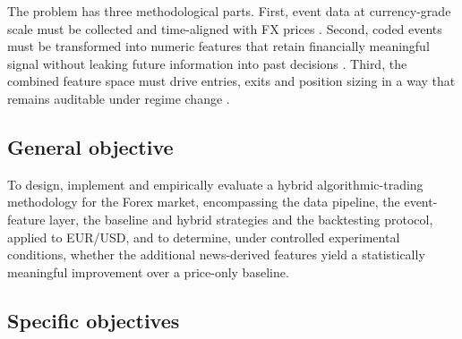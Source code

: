 The problem has three methodological parts. First, event data at currency-grade scale must be collected and time-aligned with FX prices \cite{leetaru2013gdelt}. Second, coded events must be transformed into numeric features that retain financially meaningful signal without leaking future information into past decisions \cite{loughran2011liability,tetlock2007giving}. Third, the combined feature space must drive entries, exits and position sizing in a way that remains auditable under regime change \cite{lopezdeprado2018advances}.


\subsection{General objective}

To design, implement and empirically evaluate a hybrid algorithmic-trading methodology for the Forex market, encompassing the data pipeline, the event-feature layer, the baseline and hybrid strategies and the backtesting protocol, applied to EUR/USD, and to determine, under controlled experimental conditions, whether the additional news-derived features yield a statistically meaningful improvement over a price-only baseline.

\subsection{Specific objectives}

